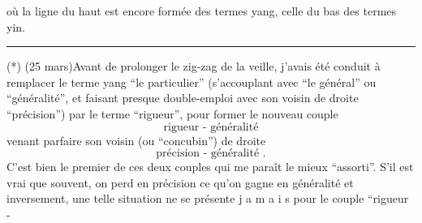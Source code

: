{où la ligne du haut est encore formée des termes yang, celle du bas des termes yin.

\noindent\rule{2.1cm}{0.4pt}

(*) (25 mars)\quad Avant de prolonger le zig-zag de la veille, j'avais été conduit à remplacer le terme yang ``le particulier'' (s'accouplant avec ``le général'' ou ``généralité'', et faisant presque double-emploi avec son voisin de droite ``précision'') par le terme ``rigueur'', pour former le nouveau couple
\[
 \text{rigueur - généralité}
\]
venant parfaire son voisin (ou ``concubin'') de droite
\[
 \text{précision - généralité .}
\]
C'est bien le premier de ces deux couples qui me paraît le mieux ``assorti''. S'il est vrai que souvent, on perd en précision ce qu'on gagne en généralité et inversement, une telle situation ne se présente j a m a i s pour le couple ``rigueur -}

